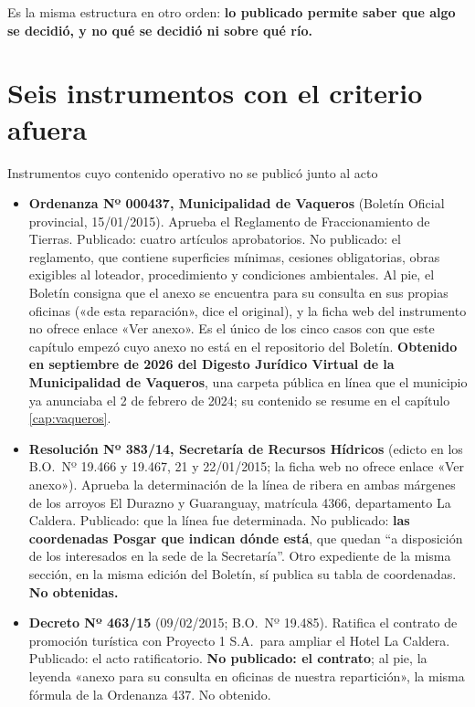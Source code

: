 Es la misma estructura en otro orden: \textbf{lo publicado permite saber que algo se decidió, y
no qué se decidió ni sobre qué río.}

\section{Seis instrumentos con el criterio afuera}

\begin{ficha}{Instrumentos cuyo contenido operativo no se publicó junto al acto}
\begin{itemize}[leftmargin=*,nosep]
\item \textbf{Ordenanza Nº 000437, Municipalidad de Vaqueros} (Boletín Oficial provincial, 15/01/2015). Aprueba el Reglamento de Fraccionamiento de Tierras. Publicado: cuatro artículos aprobatorios. No publicado: el reglamento, que contiene superficies mínimas, cesiones obligatorias, obras exigibles al loteador, procedimiento y condiciones ambientales. Al pie, el Boletín consigna que el anexo se encuentra para su consulta en sus propias oficinas («de esta reparación», dice el original), y la ficha web del instrumento no ofrece enlace «Ver anexo». Es el único de los cinco casos con que este capítulo empezó cuyo anexo no está en el repositorio del Boletín. \textbf{Obtenido en septiembre de 2026 del Digesto Jurídico Virtual de la Municipalidad de Vaqueros}, una carpeta pública en línea que el municipio ya anunciaba el 2 de febrero de 2024; su contenido se resume en el capítulo \ref{cap:vaqueros}.
\item \textbf{Resolución Nº 383/14, Secretaría de Recursos Hídricos} (edicto en los B.O.\ Nº 19.466 y 19.467, 21 y 22/01/2015; la ficha web no ofrece enlace «Ver anexo»). Aprueba la determinación de la línea de ribera en ambas márgenes de los arroyos El Durazno y Guaranguay, matrícula 4366, departamento La Caldera. Publicado: que la línea fue determinada. No publicado: \textbf{las coordenadas Posgar que indican dónde está}, que quedan ``a disposición de los interesados en la sede de la Secretaría''. Otro expediente de la misma sección, en la misma edición del Boletín, sí publica su tabla de coordenadas. \textbf{No obtenidas.}
\item \textbf{Decreto Nº 463/15} (09/02/2015; B.O.\ Nº 19.485). Ratifica el contrato de promoción turística con Proyecto 1 S.A.\ para ampliar el Hotel La Caldera. Publicado: el acto ratificatorio. \textbf{No publicado: el contrato}; al pie, la leyenda «anexo para su consulta en oficinas de nuestra repartición», la misma fórmula de la Ordenanza 437. No obtenido.

\end{itemize}
\end{ficha}
